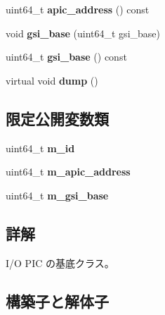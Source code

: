 \begin{DoxyCompactItemize}
\item 
\hypertarget{classirqchip__base_a8ca9afec2195c80dd49e7f735f3cd6f5}{}\label{classirqchip__base_a8ca9afec2195c80dd49e7f735f3cd6f5} 
uint64\+\_\+t {\bfseries apic\+\_\+address} () const
\item 
\hypertarget{classirqchip__base_a1984063ac11bd29816cc7a76039b37cc}{}\label{classirqchip__base_a1984063ac11bd29816cc7a76039b37cc} 
void {\bfseries gsi\+\_\+base} (uint64\+\_\+t gsi\+\_\+base)
\item 
\hypertarget{classirqchip__base_adee0f954333e81fa50265e7277da0c64}{}\label{classirqchip__base_adee0f954333e81fa50265e7277da0c64} 
uint64\+\_\+t {\bfseries gsi\+\_\+base} () const
\item 
\hypertarget{classirqchip__base_a544e712c7734cbed1f518b522e995940}{}\label{classirqchip__base_a544e712c7734cbed1f518b522e995940} 
virtual void {\bfseries dump} ()
\end{DoxyCompactItemize}
\subsection*{限定公開変数類}
\begin{DoxyCompactItemize}
\item 
\hypertarget{classirqchip__base_ae7255e86f77a25d9f726e453c6d7b5d9}{}\label{classirqchip__base_ae7255e86f77a25d9f726e453c6d7b5d9} 
uint64\+\_\+t {\bfseries m\+\_\+id}
\item 
\hypertarget{classirqchip__base_a5339ea4fc664a0d9f2d097ad898501da}{}\label{classirqchip__base_a5339ea4fc664a0d9f2d097ad898501da} 
uint64\+\_\+t {\bfseries m\+\_\+apic\+\_\+address}
\item 
\hypertarget{classirqchip__base_a31e091987d979c393448c2395d762831}{}\label{classirqchip__base_a31e091987d979c393448c2395d762831} 
uint64\+\_\+t {\bfseries m\+\_\+gsi\+\_\+base}
\end{DoxyCompactItemize}


\subsection{詳解}
I/O P\+IC の基底クラス。 

\subsection{構築子と解体子}
\hypertarget{classirqchip__base_aaf201d6819b5452b5706bab0a54a4078}{}\label{classirqchip__base_aaf201d6819b5452b5706bab0a54a4078} 
